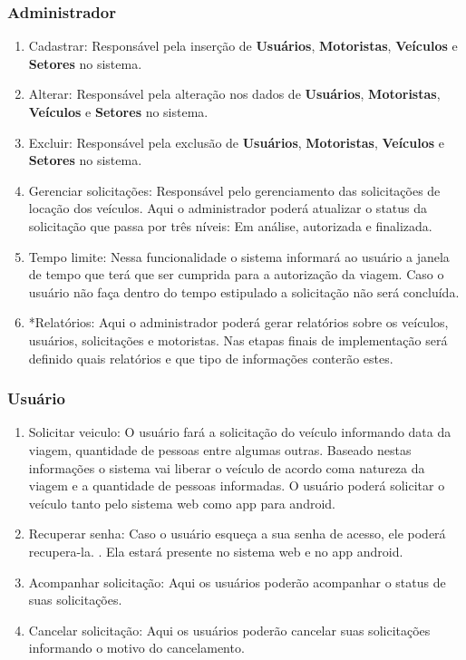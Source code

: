 \documentclass[11pt]{article}
\begin{document}
\subsubsection{Administrador}
\begin{enumerate}
\item Cadastrar: Responsável pela inserção de \textbf{Usuários}, \textbf{Motoristas}, \textbf{Veículos} e \textbf{Setores} no sistema.
\item Alterar: Responsável pela alteração nos dados de \textbf{Usuários}, \textbf{Motoristas}, \textbf{Veículos} e \textbf{Setores} no sistema.
\item Excluir: Responsável pela exclusão de \textbf{Usuários}, \textbf{Motoristas}, \textbf{Veículos} e \textbf{Setores} no sistema.
\item Gerenciar solicitações: Responsável pelo gerenciamento das solicitações de locação dos veículos. Aqui o administrador poderá atualizar o status da solicitação que passa por três níveis: Em análise, autorizada e finalizada.
\item Tempo limite: Nessa funcionalidade o sistema informará ao usuário a janela de tempo que terá que ser cumprida para a autorização da viagem. Caso o usuário não faça dentro do tempo estipulado a solicitação não será concluída.
\item *Relatórios: Aqui o administrador poderá gerar relatórios sobre os veículos, usuários, solicitações e motoristas. Nas etapas finais de implementação será definido quais relatórios e que tipo de informações conterão estes.
\end{enumerate}

\subsubsection{Usuário}
\begin{enumerate}
\item Solicitar veiculo: O usuário fará a solicitação do veículo informando data da viagem, quantidade de pessoas entre algumas outras. Baseado nestas informações o sistema vai liberar o veículo de acordo coma natureza da viagem e a quantidade de pessoas informadas. O usuário poderá solicitar o veículo tanto pelo sistema web como app para android.
\item Recuperar senha: Caso o usuário esqueça a sua senha de acesso, ele poderá recupera-la. . Ela estará presente no sistema web e no app android.
\item Acompanhar solicitação: Aqui os usuários poderão acompanhar o status de suas solicitações.
\item Cancelar solicitação: Aqui os usuários poderão cancelar suas solicitações informando o motivo do cancelamento.
\end{enumerate}
\end{document}
